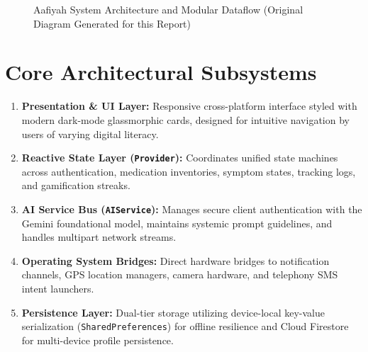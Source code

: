 \documentclass[12pt,a4paper,oneside]{report}
\begin{document}
\begin{figure}[htbp]
\centering
{}
\caption{Aafiyah System Architecture and Modular Dataflow (Original Diagram Generated for this Report)}
\label{fig:sys_arch_en}
\end{figure}

\section{Core Architectural Subsystems}
\begin{enumerate}
    \item \textbf{Presentation \& UI Layer:} Responsive cross-platform interface styled with modern dark-mode glassmorphic cards, designed for intuitive navigation by users of varying digital literacy.
    \item \textbf{Reactive State Layer (\texttt{Provider}):} Coordinates unified state machines across authentication, medication inventories, symptom states, tracking logs, and gamification streaks.
    \item \textbf{AI Service Bus (\texttt{AIService}):} Manages secure client authentication with the Gemini foundational model, maintains systemic prompt guidelines, and handles multipart network streams.
    \item \textbf{Operating System Bridges:} Direct hardware bridges to notification channels, GPS location managers, camera hardware, and telephony SMS intent launchers.
    \item \textbf{Persistence Layer:} Dual-tier storage utilizing device-local key-value serialization (\texttt{SharedPreferences}) for offline resilience and Cloud Firestore for multi-device profile persistence.
\end{enumerate}
\end{document}
